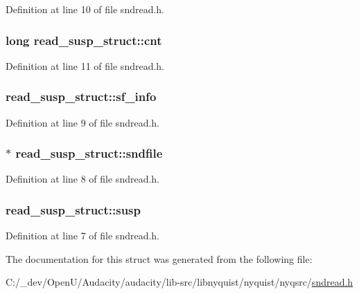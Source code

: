 Definition at line 10 of file sndread.\+h.

\subsubsection[{\texorpdfstring{cnt}{cnt}}]{\setlength{\rightskip}{0pt plus 5cm}long read\+\_\+susp\+\_\+struct\+::cnt}\hypertarget{structread__susp__struct_ad2d502eafdfec2f25b8bda4e3cd383c9}{}\label{structread__susp__struct_ad2d502eafdfec2f25b8bda4e3cd383c9}


Definition at line 11 of file sndread.\+h.

\subsubsection[{\texorpdfstring{sf\+\_\+info}{sf_info}}]{ read\+\_\+susp\+\_\+struct\+::sf\+\_\+info}\hypertarget{structread__susp__struct_a4b43e49319e316b165cc2d1badfbc367}{}\label{structread__susp__struct_a4b43e49319e316b165cc2d1badfbc367}


Definition at line 9 of file sndread.\+h.

\subsubsection[{\texorpdfstring{sndfile}{sndfile}}]{$\ast$ read\+\_\+susp\+\_\+struct\+::sndfile}\hypertarget{structread__susp__struct_a5462b07a95b5b8ba5a8cc23d017daf48}{}\label{structread__susp__struct_a5462b07a95b5b8ba5a8cc23d017daf48}


Definition at line 8 of file sndread.\+h.

\subsubsection[{\texorpdfstring{susp}{susp}}]{ read\+\_\+susp\+\_\+struct\+::susp}\hypertarget{structread__susp__struct_aa93f8c26d4f72c3b69fc682e65948b55}{}\label{structread__susp__struct_aa93f8c26d4f72c3b69fc682e65948b55}


Definition at line 7 of file sndread.\+h.



The documentation for this struct was generated from the following file\+:\begin{DoxyCompactItemize}
\item 
C\+:/\+\_\+dev/\+Open\+U/\+Audacity/audacity/lib-\/src/libnyquist/nyquist/nyqsrc/\hyperlink{sndread_8h}{sndread.\+h}\end{DoxyCompactItemize}
